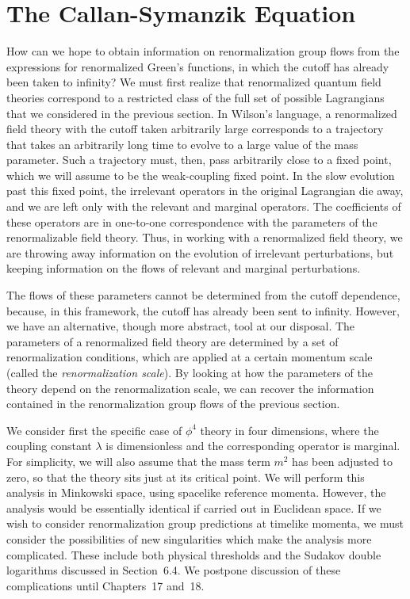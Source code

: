 \section{The Callan-Symanzik Equation}

How can we hope to obtain information on renormalization group flows from
the expressions for renormalized Green's functions, in which the cutoff has
already been taken to infinity?  We must first realize that renormalized
quantum field theories correspond to a restricted class of the full set of
possible Lagrangians that we considered in the previous section.  In Wilson's
language, a renormalized field theory with the cutoff taken arbitrarily large
corresponds to a trajectory that takes an arbitrarily long time to evolve to
a large value of the mass parameter.  Such a trajectory must, then, pass
arbitrarily close to a fixed point, which we will assume to be the
weak-coupling fixed point.  In the slow evolution past this fixed point, the
irrelevant operators in the original Lagrangian die away, and we are left
only with the relevant and marginal operators.  The coefficients of these
operators are in one-to-one correspondence with the parameters of the
renormalizable field theory.  Thus, in working with a renormalized field
theory, we are throwing away information on the evolution of irrelevant
perturbations, but keeping information on the flows of relevant and marginal
perturbations.

The flows of these parameters cannot be determined from the cutoff
dependence, because, in this framework, the cutoff has already been sent to
infinity.  However, we have an alternative, though more abstract, tool at our
disposal.  The parameters of a renormalized field theory are determined by a
set of renormalization conditions, which are applied at a certain momentum
scale (called the \emph{renormalization scale}).  By looking at how the
parameters of the theory depend on the renormalization scale, we can recover
the information contained in the renormalization group flows of the previous
section.

We consider first the specific case of $\phi^4$ theory in four dimensions,
where the coupling constant $\lambda$ is dimensionless and the corresponding
operator is marginal.  For simplicity, we will also assume that the mass term
$m^2$ has been adjusted to zero, so that the theory sits just at its critical
point.  We will perform this analysis in Minkowski space, using spacelike
reference momenta.  However, the analysis would be essentially identical if
carried out in Euclidean space.  If we wish to consider renormalization group
predictions at timelike momenta, we must consider the possibilities of new
singularities which make the analysis more complicated.  These include both
physical thresholds and the Sudakov double logarithms discussed in
Section~6.4.  We postpone discussion of these complications until
Chapters~17 and~18.

